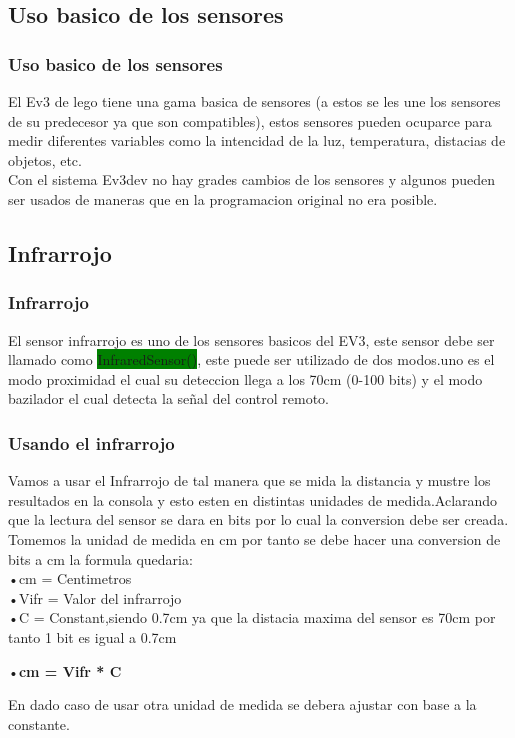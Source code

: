 \documentclass{beamer}
\begin{document}
\subsection{Uso basico de los sensores}
\begin{frame}\frametitle{Uso basico de los sensores}
El Ev3 de lego tiene una gama basica de sensores (a estos se les une los sensores de su predecesor ya que son compatibles), estos sensores pueden ocuparce para medir diferentes variables como la intencidad de la luz, temperatura, distacias de objetos, etc.\\ \vspace{5mm}
Con el sistema Ev3dev no hay grades cambios de los sensores y algunos pueden ser usados de maneras que en la programacion original no era posible.
\end{frame}

\newpage
\subsection{Infrarrojo}
\begin{frame}\frametitle{Infrarrojo}
El sensor infrarrojo es uno de los sensores basicos del EV3, este sensor debe ser llamado como \colorbox{green}{InfraredSensor()}, este puede ser utilizado de dos modos.uno es el modo proximidad el cual su deteccion llega a los 70cm (0-100 bits) y el modo bazilador el cual detecta la señal del control remoto.
\end{frame}

\newpage
\begin{frame}\frametitle{Usando el infrarrojo}
Vamos a usar el Infrarrojo de tal manera que se mida la distancia y mustre los resultados en la consola y esto esten en distintas unidades de medida.Aclarando que la lectura del sensor se dara en bits por lo cual la conversion debe ser creada.\\
Tomemos la unidad de medida en cm por tanto se debe hacer una conversion de bits a cm la formula quedaria:\\
•cm = Centimetros\\
•Vifr = Valor del infrarrojo\\
•C = Constant,siendo 0.7cm ya que la distacia maxima del sensor es 70cm por tanto 1 bit es igual a 0.7cm\\
\begin{center}
•\textbf{cm = Vifr * C}
\end{center}
En dado caso de usar otra unidad de medida se debera ajustar con base a la constante.
\end{frame}
\end{document}
